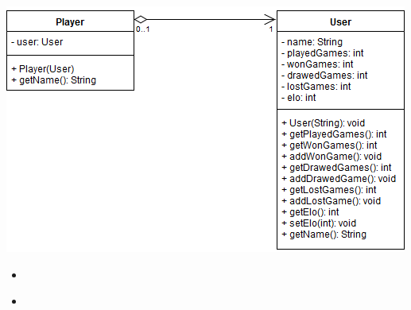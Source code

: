 \documentclass[parskip=full]{scrartcl}
\begin{document}
\begin{minipage}{\linewidth}
			\centering
			\includegraphics[width=1\linewidth]{Diagramme/Player}
			\label{fig:player}
		\end{minipage}
		\begin{itemize}
			\item
				\begin{description}
				
				\end{description}
			\item
				\begin{description}
				
				\end{description}
		\end{itemize}
		\newpage		
		
\end{document}
